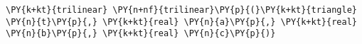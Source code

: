 \begin{Verbatim}[commandchars=\\\{\}]
  \PY{k+kt}{trilinear} \PY{n+nf}{trilinear}\PY{p}{(}\PY{k+kt}{triangle} \PY{n}{t}\PY{p}{,} \PY{k+kt}{real} \PY{n}{a}\PY{p}{,} \PY{k+kt}{real} \PY{n}{b}\PY{p}{,} \PY{k+kt}{real} \PY{n}{c}\PY{p}{)}
\end{Verbatim}
